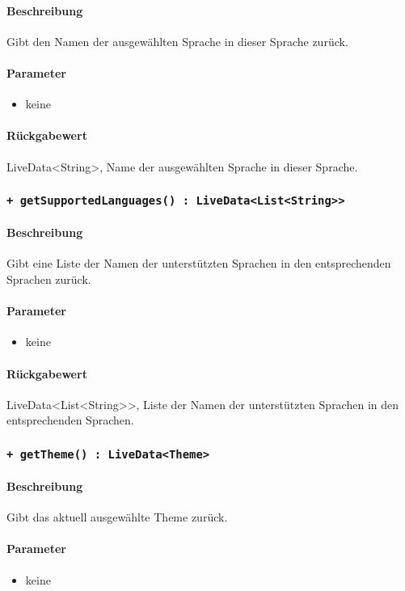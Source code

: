 \paragraph*{Beschreibung}
Gibt den Namen der ausgewählten Sprache in dieser Sprache zurück.
\paragraph*{Parameter}
\begin{itemize}
    \item keine
\end{itemize}
\paragraph*{Rückgabewert}
LiveData<String>, Name der ausgewählten Sprache in dieser Sprache.

\subsubsection*{\texttt{+ getSupportedLanguages() : LiveData<List<String>>}}%
\paragraph*{Beschreibung}
Gibt eine Liste der Namen der unterstützten Sprachen in den entsprechenden Sprachen zurück.
\paragraph*{Parameter}
\begin{itemize}
    \item keine
\end{itemize}
\paragraph*{Rückgabewert}
LiveData<List<String>>, Liste der Namen der unterstützten Sprachen in den entsprechenden Sprachen.

\subsubsection*{\texttt{+ getTheme() : LiveData<Theme>}}%
\paragraph*{Beschreibung}
Gibt das aktuell ausgewählte Theme zurück.
\paragraph*{Parameter}
\begin{itemize}
    \item keine
\end{itemize}
